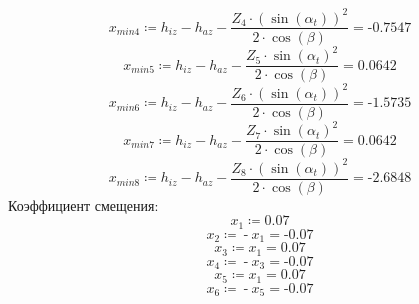 \documentclass{article}
\newcommand{\defeq}{\coloneq} %
\begin{document}
\begin{equation*}
\textit{x}_{\textit{min4}} \defeq h_{iz}-h_{az}-\frac{\textit{Z}_{\textit{4}} \cdot \left( \sin \left( α_{t} \right) \right)^{2}}{2 \cdot \cos \left( {\beta} \right)} = { \operatorname{-} 0.7547}
\end{equation*}
\begin{equation*}
\textit{x}_{\textit{min5}} \defeq h_{iz}-h_{az}-\frac{\textit{Z}_{\textit{5}} \cdot \sin \left( α_{t} \right)^{2}}{2 \cdot \cos \left( {\beta} \right)} = {0.0642}
\end{equation*}
\begin{equation*}
\textit{x}_{\textit{min6}} \defeq h_{iz}-h_{az}-\frac{\textit{Z}_{\textit{6}} \cdot \left( \sin \left( α_{t} \right) \right)^{2}}{2 \cdot \cos \left( {\beta} \right)} = { \operatorname{-} 1.5735}
\end{equation*}
\begin{equation*}
\textit{x}_{\textit{min7}} \defeq h_{iz}-h_{az}-\frac{\textit{Z}_{\textit{7}} \cdot \sin \left( α_{t} \right)^{2}}{2 \cdot \cos \left( {\beta} \right)} = {0.0642}
\end{equation*}
\begin{equation*}
\textit{x}_{\textit{min8}} \defeq h_{iz}-h_{az}-\frac{\textit{Z}_{\textit{8}} \cdot \left( \sin \left( α_{t} \right) \right)^{2}}{2 \cdot \cos \left( {\beta} \right)} = { \operatorname{-} 2.6848}
\end{equation*}
\colorbox[HTML]{000000}{Коэффициент смещения:}\newline
\begin{equation*}
\textit{x}_{\textit{1}} \defeq 0.07
\end{equation*}
\begin{equation*}
\textit{x}_{\textit{2}} \defeq  \operatorname{-} \textit{x}_{\textit{1}} = { \operatorname{-} 0.07}
\end{equation*}
\begin{equation*}
\textit{x}_{\textit{3}} \defeq \textit{x}_{\textit{1}} = {0.07}
\end{equation*}
\begin{equation*}
\textit{x}_{\textit{4}} \defeq  \operatorname{-} \textit{x}_{\textit{3}} = { \operatorname{-} 0.07}
\end{equation*}
\begin{equation*}
\textit{x}_{\textit{5}} \defeq \textit{x}_{\textit{1}} = {0.07}
\end{equation*}
\begin{equation*}
\textit{x}_{\textit{6}} \defeq  \operatorname{-} \textit{x}_{\textit{5}} = { \operatorname{-} 0.07}
\end{equation*}
\end{document}
